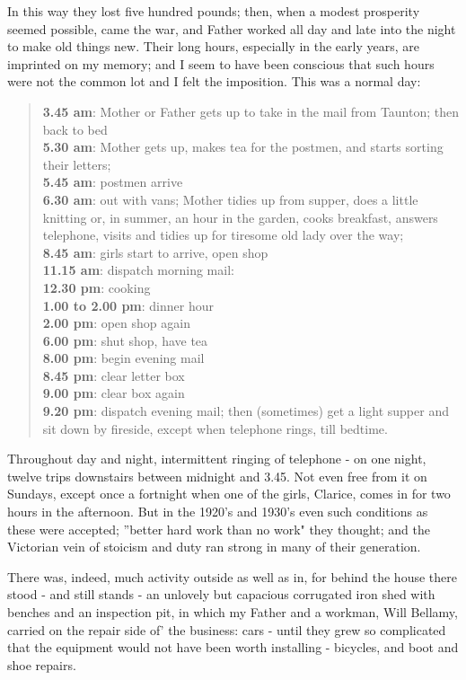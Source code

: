 In this way they lost five hundred pounds; then, when a modest prosperity seemed possible, came the war, and Father worked all day and late into the night to make old things new. Their long hours, especially in the early years, are imprinted on my memory; and I seem to have been conscious that such hours were not the common lot and I felt the imposition. This was a normal day: 

\begin{quote}
\textbf{3.45 am}: Mother or Father gets up to take in the mail from Taunton; then back to bed
\\ \textbf{5.30 am}: Mother gets up, makes tea for the postmen, and starts sorting their letters; 
\\ \textbf{5.45 am}: postmen arrive
\\ \textbf{6.30 am}: out with vans; Mother tidies up from supper, does a little knitting or, in summer, an hour in the garden, cooks breakfast, answers telephone, visits and tidies up for tiresome old lady over the way; 
\\ \textbf{8.45 am}: girls start to arrive, open shop 
\\ \textbf{11.15 am}: dispatch morning mail:
\\ \textbf{12.30 pm}: cooking
\\ \textbf{1.00 to 2.00 pm}: dinner hour
\\ \textbf{2.00 pm}: open shop again
\\ \textbf{6.00 pm}: shut shop, have tea
\\ \textbf{8.00 pm}: begin evening mail
\\ \textbf{8.45 pm}: clear letter box
\\ \textbf{9.00 pm}: clear box again
\\ \textbf{9.20 pm}:  dispatch evening mail; then (sometimes) get a light supper and sit down by fireside, except when telephone rings, till bedtime. 
\end{quote}

Throughout day and night, intermittent ringing of telephone - on one night, twelve trips downstairs between midnight and 3.45. Not even free from it on Sundays, except once a fortnight when one of the girls, Clarice, comes in for two hours in the afternoon.
But in the 1920's and 1930's even such conditions as these were accepted; ''better hard work than no work" they thought; and the Victorian vein of stoicism and duty ran strong in many of their generation.

There was, indeed, much activity outside as well as in, for behind the house there stood - and still stands - an unlovely but capacious corrugated iron shed with benches and an inspection pit, in which my Father and a workman, Will Bellamy, carried on the repair side of' the business: cars - until they grew so complicated that the equipment would not have been worth installing - bicycles, and boot and shoe repairs.

